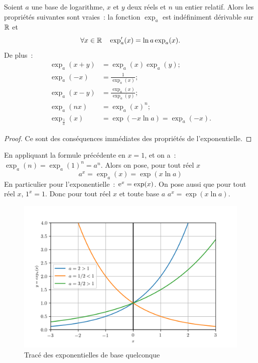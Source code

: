 \begin{prop}
    Soient \(a\) une base de logarithme, \(x\) et \(y\) deux réels et \(n\) 
    un entier relatif. Alors les propriétés suivantes sont vraies~: la 
    fonction \(\exp_a\) est indéfiniment dérivable sur \(\mathbb{R}\) et
    \begin{equation}
        \forall x \in \mathbb{R} \quad \exp_a'(x)=\ln a \exp_a(x).
    \end{equation}
    De plus~:
    \begin{align}
        \exp_a(x+y)&=\exp_a(x) \exp_a(y); \\
        \exp_a(-x)&=\frac{1}{\exp_a(x)}; \\
        \exp_a(x-y)&=\frac{\exp_a(x)}{\exp_a(y)}; \\
        \exp_a(nx)&=\exp_a(x)^n;\\
        \exp_{\frac{1}{a}}(x)&=\exp(-x \ln a)=\exp_a(-x).
    \end{align}
\end{prop}
\begin{proof}
    Ce sont des conséquences immédiates des propriétés de l'exponentielle.
\end{proof}
En appliquant la formule précédente en \(x=1\), et on a~: 
\(\exp_a(n)=\exp_a(1)^n=a^n\). Alors on pose, pour tout réel \(x\)
\begin{equation}
    a^x=\exp_a(x)=\exp(x \ln a)
\end{equation}
En particulier pour l'exponentielle~: \(\operatorname{e}^x=\exp(x)\). On pose aussi que 
pour tout réel \(x\), \(1^x=1\). Donc pour tout réel \(x\) et toute base 
\(a\) \(a^x=\exp(x \ln a)\).
\begin{figure}
    \centering
    \includegraphics[scale=0.8]{expa.png}
    \caption{Tracé des exponentielles de base quelconque}
    \label{fig:traceexpa}
\end{figure}
